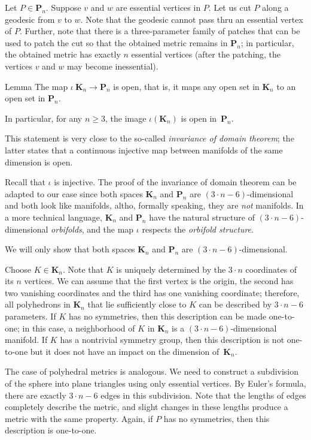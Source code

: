 Let $P\in\mathbf{P}_n$.
Suppose $v$ and $w$ are essential vertices in $P$.
Let us cut $P$ along a geodesic from $v$ to $w$.
Note that the geodesic cannot pass thru an essential vertex of $P$.
Further, note that there is a three-parameter family of patches that can be used to patch the cut so that the obtained metric remains in $\mathbf{P}_n$;
in particular, the obtained metric has exactly $n$ essential vertices (after the patching, the vertices $v$ and $w$ may become inessential).


\begin{thm}{Lemma}
The map $\iota\:\mathbf{K}_n\to\mathbf{P}_n$ is open, 
that is, it maps any open set in $\mathbf{K}_n$ to an open set in $\mathbf{P}_n$.

In particular, for any $n\ge 3$, the image $\iota(\mathbf{K}_n)$ is open in~$\mathbf{P}_n$.
\end{thm}

This statement is very close to the so-called \textit{invariance of domain theorem};
the latter states that a continuous injective map between manifolds of the same dimension is open.

Recall that $\iota$ is injective.
The proof of the invariance of domain theorem can be adapted to our case since both spaces $\mathbf{K}_n$ and $\mathbf{P}_n$ are $(3\cdot n-6)$-dimensional and both look like manifolds, altho, formally speaking, they are \textit{not} manifolds.
In a more technical language, $\mathbf{K}_n$ and $\mathbf{P}_n$ have the natural structure of $(3\cdot n-6)$-dimensional \textit{orbifolds},
and the map $\iota$ respects the \textit{orbifold structure}.

We will only show that both spaces $\mathbf{K}_n$ and $\mathbf{P}_n$ are $(3\cdot n-6)$-dimensional.

Choose  $K\in\mathbf{K}_n$.
Note that $K$ is uniquely determined by the $3\cdot n$ coordinates of its $n$ vertices.
We can assume that the first vertex is the origin, the second has two vanishing coordinates and the third has one vanishing coordinate; therefore, all polyhedrons in $\mathbf{K}_n$ that lie sufficiently close to $K$ can be described by $3\cdot n-6$ parameters.
If $K$ has no symmetries, then this description can be made one-to-one;
in this case, a neighborhood of $K$ in $\mathbf{K}_n$ is a $(3\cdot n-6)$-dimensional manifold.
If $K$ has a nontrivial symmetry group, then this description is not one-to-one but it does not have an impact on the dimension of~$\mathbf{K}_n$.

The case of polyhedral metrics is analogous.
We need to construct a subdivision of the sphere into plane triangles using only essential vertices.
By Euler's formula, there are exactly $3\cdot n-6$ edges in this subdivision.
Note that the lengths of edges completely describe the metric, and slight changes in these lengths produce a metric with the same property.
Again, if $P$ has no symmetries, then this description is one-to-one.

